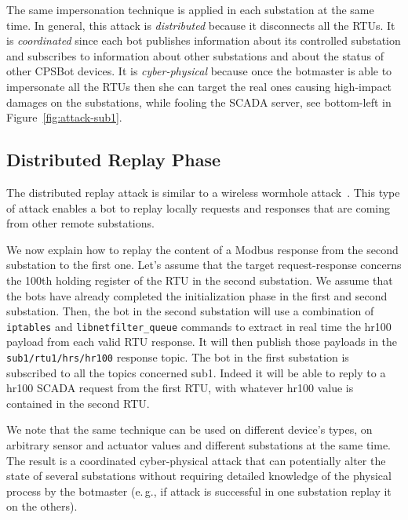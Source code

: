 \documentclass[sigconf]{acmart}
\makeatletter
\newcommand{\eg}{e.\@\,g.,\@\xspace}
\newcommand{\tcircle}[1]{\raisebox{.5pt}{\textcolor{SUTDred}{\textcircled{\raisebox{-.9pt} {#1}}}}}
\newcommand{\Botnet}{CPSBot\@\xspace}
\makeatother
\begin{document}
The same impersonation technique is applied in each substation at
the same time. In general, this attack is \emph{distributed} because it
disconnects all the RTUs. It is \emph{coordinated} since each bot publishes
information about its controlled substation and subscribes to information
about other substations and about the status of other \Botnet devices. It is
\emph{cyber-physical} because once the
botmaster is able to impersonate all the RTUs then she can target the real
ones causing high-impact damages on the substations, while fooling the SCADA
server, see bottom-left \tcircle{3} in Figure~\ref{fig:attack-sub1}.


\subsection{Distributed Replay Phase}
\label{sec:replay}

The distributed replay attack is similar to a wireless
wormhole attack~\cite{hu06wormhole}. This type of attack enables a bot
to replay locally requests and responses that are coming from other remote
substations.

We now explain how to replay the content of a Modbus response
from the second substation to the first one. Let's assume that the target
request-response concerns the 100th holding register of the RTU in the second
substation. We assume
that the bots have already completed the initialization phase in the first
and second substation. Then,
the bot in the second substation will use a combination of \texttt{iptables}
and \texttt{libnetfilter\_queue} commands to extract in real time the hr100
payload from each valid RTU response. It will then
publish those payloads in the \texttt{sub1/rtu1/hrs/hr100} response topic.
The bot in the
first substation is subscribed to all the topics concerned sub1. Indeed it
will be able to reply to a hr100 SCADA request from the first RTU, with whatever
hr100 value is contained in the second RTU\@.

We note that the same technique can be used on different device's types, on
arbitrary sensor and actuator values and different substations at the same
time. The result is a coordinated cyber-physical attack that can potentially
alter the state of several substations without requiring detailed knowledge
of the physical process by the botmaster (\eg if attack is successful in one
substation replay it on the others).


\end{document}
